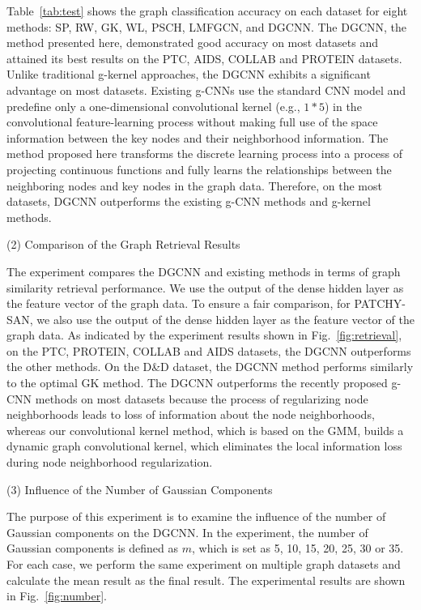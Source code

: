 \documentclass[11pt]{article}
\begin{document}
Table~\ref{tab:test} shows the graph classification accuracy on each dataset for eight methods: SP, RW, GK, WL, PSCH, LMFGCN, and DGCNN. The DGCNN, the method presented here, demonstrated good accuracy on most datasets and attained its best results on the PTC, AIDS, COLLAB and PROTEIN datasets. Unlike traditional g-kernel approaches, the DGCNN exhibits a significant advantage on most datasets. Existing g-CNNs use the standard CNN model and predefine only a one-dimensional convolutional kernel (e.g., $1*5$) in the convolutional feature-learning process without making full use of the space information between the key nodes and their neighborhood information. The method proposed here transforms the discrete learning process into a process of projecting continuous functions and fully learns the relationships between the neighboring nodes and key nodes in the graph data. Therefore, on the most datasets, DGCNN outperforms the existing g-CNN methods and g-kernel methods.

(2) Comparison of the Graph Retrieval Results



The experiment compares the DGCNN and existing methods in terms of graph similarity retrieval performance. We use the output of the dense hidden layer as the feature vector of the graph data. To ensure a fair comparison, for PATCHY-SAN, we also use the output of the dense hidden layer as the feature vector of the graph data. As indicated by the experiment results shown in Fig.~\ref{fig:retrieval}, on the PTC, PROTEIN, COLLAB and AIDS datasets, the DGCNN outperforms the other methods. On the D\&D dataset, the DGCNN method performs similarly to the optimal GK method. The DGCNN outperforms the recently proposed g-CNN methods on most datasets because the process of regularizing node neighborhoods leads to loss of information about the node neighborhoods, whereas our convolutional kernel method, which is based on the GMM, builds a dynamic graph convolutional kernel, which eliminates the local information loss during node neighborhood regularization.

(3) Influence of the Number of Gaussian Components


The purpose of this experiment is to examine the influence of the number of Gaussian components on the DGCNN. In the experiment, the number of Gaussian components is defined as $m$, which is set as 5, 10, 15, 20, 25, 30 or 35. For each case, we perform the same experiment on multiple graph datasets and calculate the mean result as the final result. The experimental results are shown in Fig.~\ref{fig:number}.
\end{document}
